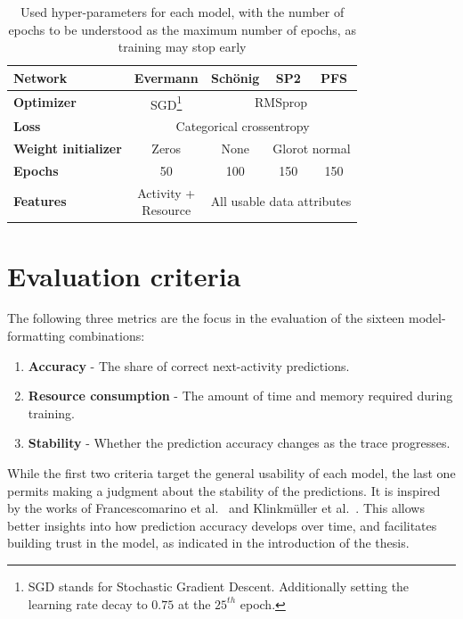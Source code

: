 \begin{table}[ht!]
    \centering
    \begin{tabular}{lcccc}
        \textbf{Network}   & \textbf{Evermann} & \textbf{Schönig} & \textbf{SP2} & \textbf{PFS}\\
        \hline
        \textbf{Optimizer} & SGD\footnote{SGD stands for Stochastic Gradient Descent. Additionally setting the learning rate decay to $0.75$ at the $25^{th}$ epoch.} & \multicolumn{3}{c}{RMSprop} \\
        \textbf{Loss}      &\multicolumn{4}{c}{Categorical crossentropy}\\
        \textbf{Weight initializer} & Zeros & None & \multicolumn{2}{c}{Glorot normal}\\
        \textbf{Epochs}    & 50 & 100 & 150 & 150\\
        \textbf{Features}  & \makecell{Activity +\\Resource} & \multicolumn{3}{c}{All usable data attributes}\\
    \end{tabular}
    \caption{Used hyper-parameters for each model, with the number of epochs to be understood as the maximum number of epochs, as training may stop early}
    \label{tab:training-setup}
\end{table}

\section{Evaluation criteria}
\label{sec:eval:criteria}
The following three metrics are the focus in the evaluation of the sixteen model-formatting combinations:

\begin{enumerate}
    \item\textbf{Accuracy} - The share of correct next-activity predictions.
    \item\textbf{Resource consumption} - The amount of time and memory required during training.
    \item\textbf{Stability} - Whether the prediction accuracy changes as the trace progresses.
\end{enumerate}

While the first two criteria target the general usability of each model, the last one permits making a judgment about the stability of the predictions. It is inspired by the works of Francescomarino et al.~\cite{francescomarino2015} and Klinkmüller et al.~\cite{klinkmuller2018reliablemonitoring}. This allows better insights into how prediction accuracy develops over time, and facilitates building trust in the model, as indicated in the introduction of the thesis.

